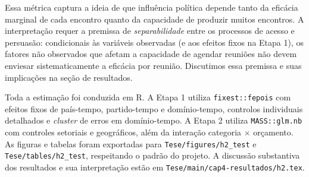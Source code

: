 Essa métrica captura a ideia de que influência política depende tanto da eficácia marginal de cada encontro quanto da capacidade de produzir muitos encontros. A interpretação requer a premissa de \textit{separabilidade} entre os processos de acesso e persuasão: condicionais às variáveis observadas (e aos efeitos fixos na Etapa 1), os fatores não observados que afetam a capacidade de agendar reuniões não devem enviesar sistematicamente a eficácia por reunião. Discutimos essa premissa e suas implicações na seção de resultados.

Toda a estimação foi conduzida em R. A Etapa 1 utiliza \texttt{fixest::fepois} com efeitos fixos de país-tempo, partido-tempo e domínio-tempo, controlos individuais detalhados e \textit{cluster} de erros em domínio-tempo. A Etapa 2 utiliza \texttt{MASS::glm.nb} com controles setoriais e geográficos, além da interação categoria $\times$ orçamento. As figuras e tabelas foram exportadas para \texttt{Tese/figures/h2\_test} e \texttt{Tese/tables/h2\_test}, respeitando o padrão do projeto. A discussão substantiva dos resultados e sua interpretação estão em \texttt{Tese/main/cap4-resultados/h2.tex}.

